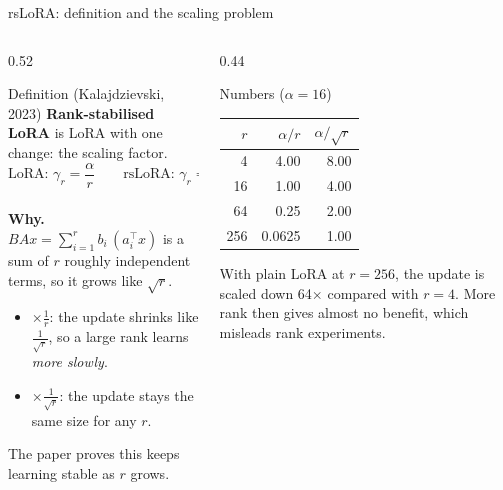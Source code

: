 \documentclass[aspectratio=169,11pt]{beamer}
\begin{document}
\begin{frame}{rsLoRA: definition and the scaling problem}
  \begin{columns}[T]
    \begin{column}{0.52\textwidth}
      \begin{block}{Definition (Kalajdzievski, 2023)}
        \small
        \textbf{Rank-stabilised LoRA} is LoRA with one change: the scaling factor.
        \[
          \text{LoRA: } \gamma_r=\frac{\alpha}{r}\qquad\text{rsLoRA: } \gamma_r=\frac{\alpha}{\sqrt{r}}
        \]
      \end{block}
      \small
      \textbf{Why.} $BAx=\sum_{i=1}^{r} b_i\,(a_i^\top x)$ is a sum of $r$ roughly independent terms, so it grows like $\sqrt r$.
      \begin{itemize}
        \item $\times\frac1r$: the update shrinks like $\frac{1}{\sqrt r}$, so a large rank learns \emph{more slowly}.
        \item $\times\frac1{\sqrt r}$: the update stays the same size for any $r$.
      \end{itemize}
      The paper proves this keeps learning stable as $r$ grows.
    \end{column}
    \begin{column}{0.44\textwidth}
      \begin{exampleblock}{Numbers ($\alpha=16$)}
        \small
        \begin{tabular}{@{}rrr@{}}
          \toprule
          $r$ & $\alpha/r$ & $\alpha/\sqrt r$\\
          \midrule
          4 & 4.00 & 8.00\\
          16 & 1.00 & 4.00\\
          64 & 0.25 & 2.00\\
          256 & 0.0625 & 1.00\\
          \bottomrule
        \end{tabular}
        \vspace{1mm}

        With plain LoRA at $r=256$, the update is scaled down 64$\times$ compared with $r=4$. More rank then gives almost no benefit, which misleads rank experiments.
      \end{exampleblock}
    \end{column}
  \end{columns}
\end{frame}
\end{document}
